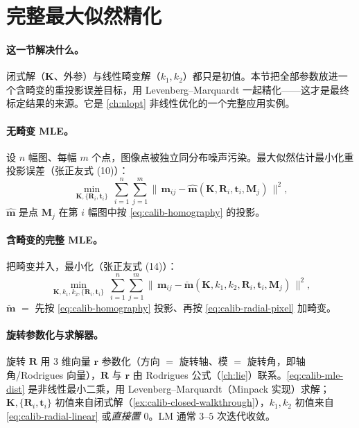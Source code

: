 \section{完整最大似然精化}
\label{sec:calib-mle}

\paragraph{这一节解决什么。}
闭式解（$\mathbf{K}$、外参）与线性畸变解（$k_1,k_2$）都只是初值。本节把全部参数放进一个含畸变的重投影误差目标，用 Levenberg--Marquardt 一起精化——这才是最终标定结果的来源。它是 \cref{ch:nlopt} 非线性优化的一个完整应用实例。

\paragraph{无畸变 MLE。}
设 $n$ 幅图、每幅 $m$ 个点，图像点被独立同分布噪声污染。最大似然估计最小化重投影误差（张正友式 (10)\cite{zhang2000calibration}）：
\begin{equation}
  \min_{\mathbf{K},\{\mathbf{R}_i,\mathbf{t}_i\}}\ \sum_{i=1}^{n}\sum_{j=1}^{m}\big\|\,\mathbf{m}_{ij}-\hat{\mathbf{m}}(\mathbf{K},\mathbf{R}_i,\mathbf{t}_i,\mathbf{M}_j)\,\big\|^2,
  \label{eq:calib-mle}
\end{equation}
$\hat{\mathbf{m}}$ 是点 $\mathbf{M}_j$ 在第 $i$ 幅图中按 \cref{eq:calib-homography} 的投影。

\paragraph{含畸变的完整 MLE。}
把畸变并入，最小化（张正友式 (14)\cite{zhang2000calibration}）：
\begin{equation}
  \min_{\mathbf{K},k_1,k_2,\{\mathbf{R}_i,\mathbf{t}_i\}}\ \sum_{i=1}^{n}\sum_{j=1}^{m}\big\|\,\mathbf{m}_{ij}-\breve{\mathbf{m}}(\mathbf{K},k_1,k_2,\mathbf{R}_i,\mathbf{t}_i,\mathbf{M}_j)\,\big\|^2,
  \label{eq:calib-mle-dist}
\end{equation}
$\breve{\mathbf{m}}$ $=$ 先按 \cref{eq:calib-homography} 投影、再按 \cref{eq:calib-radial-pixel} 加畸变。

\paragraph{旋转参数化与求解器。}
旋转 $\mathbf{R}$ 用 $3$ 维向量 $\mathbf{r}$ 参数化（方向 $=$ 旋转轴、模 $=$ 旋转角，即轴角/Rodrigues 向量），$\mathbf{R}$ 与 $\mathbf{r}$ 由 Rodrigues 公式（\cref{ch:lie}）联系。\cref{eq:calib-mle-dist} 是非线性最小二乘，用 Levenberg--Marquardt\cite{more1978lm}（Minpack 实现）求解；$\mathbf{K},\{\mathbf{R}_i,\mathbf{t}_i\}$ 初值来自闭式解（\cref{ex:calib-closed-walkthrough}），$k_1,k_2$ 初值来自 \cref{eq:calib-radial-linear} 或\emph{直接置 $0$}。LM 通常 $3$--$5$ 次迭代收敛\cite{zhang2000calibration}。

